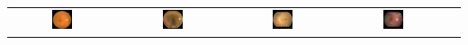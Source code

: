 \begin{frame}
{\begin{tabular}{|@{}c@{}|@{}c@{}|@{}c@{}|@{}c@{}|@{}c@{}|}
	\includegraphics[width=0.2\textwidth]{pics/classified_samples/204_right_1_blobs.jpg} &
	\includegraphics[width=0.2\textwidth]{pics/classified_samples/82_right_2_blobs.jpg} &
	\includegraphics[width=0.2\textwidth]{pics/classified_samples/687_right_3_blobs.jpg} &
	\includegraphics[width=0.2\textwidth]{pics/classified_samples/2496_left_4_blobs.jpg} \\

\end{tabular}
}



\end{frame}
